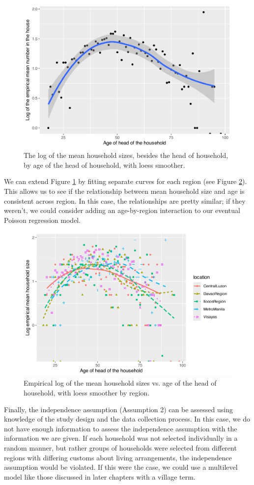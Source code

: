 \documentclass[
]{krantz}
\begin{document}
\begin{figure}

{\centering \includegraphics[width=0.6\linewidth]{bookdown-BeyondMLR_files/figure-latex/ageXnhouse-1} 

}

\caption{The log of the mean household sizes, besides the head of household, by age of the head of household, with loess smoother.}\label{fig:ageXnhouse}
\end{figure}

We can extend Figure \ref{fig:ageXnhouse} by fitting separate curves for each region (see Figure \ref{fig:byregion}). This allows us to see if the relationship between mean household size and age is consistent across region. In this case, the relationships are pretty similar; if they weren't, we could consider adding an age-by-region interaction to our eventual Poisson regression model.

\begin{figure}

{\centering \includegraphics[width=0.6\linewidth]{bookdown-BeyondMLR_files/figure-latex/byregion-1} 

}

\caption{Empirical log of the mean household sizes vs. age of the head of household, with loess smoother by region.}\label{fig:byregion}
\end{figure}

Finally, the independence assumption (Assumption 2) can be assessed using knowledge of the study design and the data collection process. In this case, we do not have enough information to assess the independence assumption with the information we are given. If each household was not selected individually in a random manner, but rather groups of households were selected from different regions with differing customs about living arrangements, the independence assumption would be violated. If this were the case, we could use a multilevel model like those discussed in later chapters with a village term.
\end{document}
